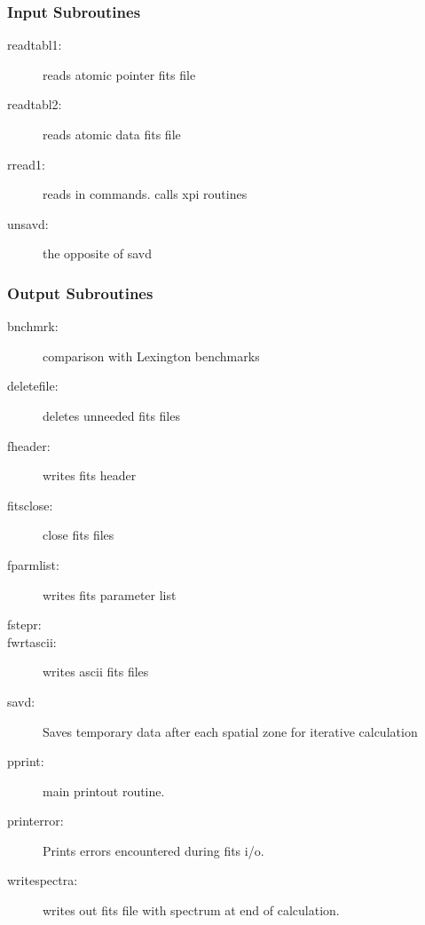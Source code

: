 \subsubsection {Input Subroutines}

\begin{description}

\item[readtabl1:] reads atomic pointer fits file

\item[readtabl2:] reads atomic data fits file

\item[rread1:] reads in commands.  calls xpi routines


\item[unsavd:] the opposite of savd

\end{description}


\subsubsection {Output Subroutines}

\begin{description}

\item[bnchmrk:] comparison with Lexington benchmarks

\item[deletefile:] deletes unneeded fits files

\item[fheader:] writes fits header

\item[fitsclose:] close fits files

\item[fparmlist:] writes fits parameter list

\item[fstepr:]

\item[fwrtascii:] writes ascii fits  files

\item[savd:]  Saves temporary data after each spatial zone for 
iterative calculation

\item[pprint:] main printout routine.

\item[printerror:] Prints errors encountered during fits i/o.

\item[writespectra:] writes out fits file with spectrum at end of calculation.


\end{description}


